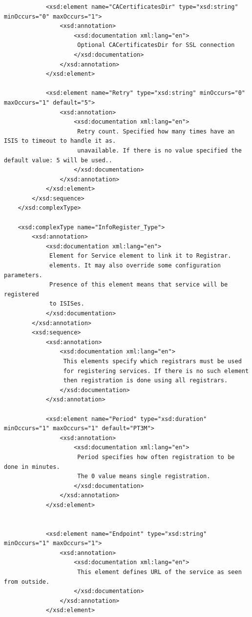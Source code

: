 \documentclass{book}
\begin{document}
\begin{verbatim}
            <xsd:element name="CACertificatesDir" type="xsd:string"  minOccurs="0" maxOccurs="1">
                <xsd:annotation>
                    <xsd:documentation xml:lang="en">
                     Optional CACertificatesDir for SSL connection
                    </xsd:documentation>
                </xsd:annotation>
            </xsd:element>

            <xsd:element name="Retry" type="xsd:string" minOccurs="0" maxOccurs="1" default="5">
                <xsd:annotation>
                    <xsd:documentation xml:lang="en">
                     Retry count. Specified how many times have an ISIS to timeout to handle it as.
                     unavailable. If there is no value specified the default value: 5 will be used..
                    </xsd:documentation>
                </xsd:annotation>
            </xsd:element>
        </xsd:sequence>
    </xsd:complexType>

    <xsd:complexType name="InfoRegister_Type">
        <xsd:annotation>
            <xsd:documentation xml:lang="en">
             Element for Service element to link it to Registrar.
             elements. It may also override some configuration parameters.
             Presence of this element means that service will be registered
             to ISISes.
            </xsd:documentation>
        </xsd:annotation>
        <xsd:sequence>
            <xsd:annotation>
                <xsd:documentation xml:lang="en">
                 This elements specify which registrars must be used
                 for registering services. If there is no such element
                 then registration is done using all registrars.
                </xsd:documentation>
            </xsd:annotation>

            <xsd:element name="Period" type="xsd:duration" minOccurs="1" maxOccurs="1" default="PT3M">
                <xsd:annotation>
                    <xsd:documentation xml:lang="en">
                     Period specifies how often registration to be done in minutes.
                     The 0 value means single registration.
                    </xsd:documentation>
                </xsd:annotation>
            </xsd:element>


            <xsd:element name="Endpoint" type="xsd:string" minOccurs="1" maxOccurs="1">
                <xsd:annotation>
                    <xsd:documentation xml:lang="en">
                     This element defines URL of the service as seen from outside.
                    </xsd:documentation>
                </xsd:annotation>
            </xsd:element>


\end{verbatim}
\end{document}
